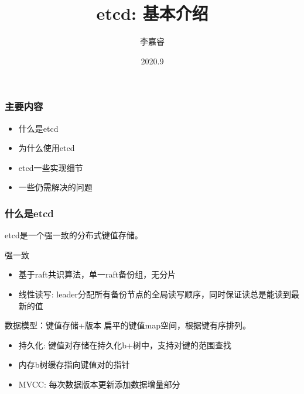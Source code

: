 \documentclass{beamer}
\title{etcd: 基本介绍}
\author{李嘉睿}
\institute[]{中间件团队}
\date{2020.9}
\begin{document}
\frame{\titlepage}

\begin{frame}
\frametitle{主要内容}
\tableofcontents
\begin{itemize}
    \item 什么是etcd
    \item 为什么使用etcd
    \item etcd一些实现细节
    \item 一些仍需解决的问题
\end{itemize}
\end{frame}

\begin{frame}
\frametitle{什么是etcd}
etcd是一个\alert{强一致}的分布式\alert{键值存储}。

\begin{block}{强一致}
\begin{itemize}
    \item 基于raft共识算法，单一raft备份组，无分片
    \item \alert{线性读写:} leader分配所有备份节点的全局读写顺序，同时保证读总是能读到最新的值
\end{itemize}
\end{block}

\begin{block}{数据模型：键值存储+版本}
扁平的键值map空间，根据键有序排列。
\begin{itemize}
    \item \alert{持久化:} 键值对存储在持久化b+树中，支持对键的范围查找
    \item 内存b树缓存指向键值对的指针
    \item \alert{MVCC:} 每次数据版本更新添加数据增量部分
\end{itemize}
\end{block}
\end{frame}
\end{document}
